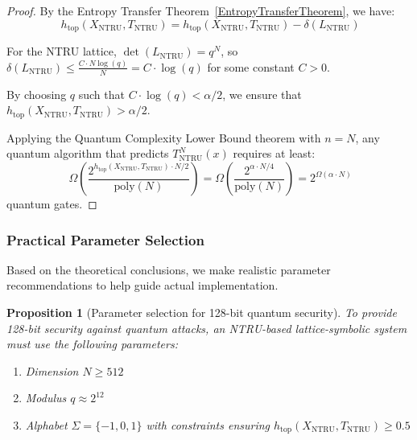 \documentclass[12pt,a4paper]{article}
\newtheorem{proposition}[theorem]{Proposition}
\begin{document}
\begin{proof}
By the Entropy Transfer Theorem~\ref{EntropyTransferTheorem}, we have:
\begin{equation}~\label{eq1SecurityofNTRUBasedLatticeSymbolicSystems}
h_{\text{top}}(X_{\text{NTRU}}, T_{\text{NTRU}}) = h_{\text{top}}(X_{\text{NTRU}}, T_{\text{NTRU}}) - \delta(L_{\text{NTRU}})
\end{equation}

For the NTRU lattice, $\det(L_{\text{NTRU}}) = q^N$, so $\delta(L_{\text{NTRU}}) \leq \frac{C \cdot N \log(q)}{N} = C \cdot \log(q)$ for some constant $C > 0$.

By choosing $q$ such that $C \cdot \log(q) < \alpha/2$, we ensure that $h_{\text{top}}(X_{\text{NTRU}}, T_{\text{NTRU}}) > \alpha/2$.

Applying the Quantum Complexity Lower Bound theorem with $n = N$, any quantum algorithm that predicts $T_{\text{NTRU}}^N(x)$ requires at least:
\begin{equation}~\label{eq2SecurityofNTRUBasedLatticeSymbolicSystems}
\Omega\left(\frac{2^{h_{\text{top}}(X_{\text{NTRU}},T_{\text{NTRU}}) \cdot N/2}}{\text{poly}(N)}\right) = \Omega\left(\frac{2^{\alpha \cdot N/4}}{\text{poly}(N)}\right) = 2^{\Omega(\alpha \cdot N)}
\end{equation}
quantum gates.
\end{proof}
\subsubsection{Practical Parameter Selection}

Based on the theoretical conclusions, we make realistic parameter recommendations to help guide actual implementation.

\begin{proposition}[Parameter selection for 128-bit quantum security]
To provide 128-bit security against quantum attacks, an NTRU-based lattice-symbolic system must use the following parameters:
\begin{enumerate}
\item Dimension $N \geq 512$
\item Modulus $q \approx 2^{12}$
\item Alphabet $\Sigma = \{-1, 0, 1\}$ with constraints ensuring $h_{\text{top}}(X_{\text{NTRU}}, T_{\text{NTRU}}) \geq 0.5$
\end{enumerate}
\end{proposition}
\end{document}
